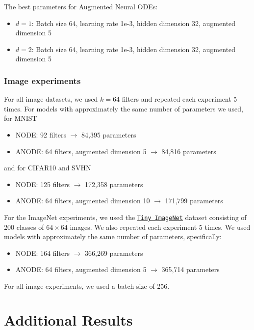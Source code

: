 \documentclass{article}
\begin{document}
The best parameters for Augmented Neural ODEs:

\begin{itemize}
    \item $d=1$: Batch size 64, learning rate 1e-3, hidden dimension 32, augmented dimension 5
    \item $d=2$: Batch size 64, learning rate 1e-3, hidden dimension 32, augmented dimension 5
\end{itemize}

\subsubsection{Image experiments}

For all image datasets, we used $k=64$ filters and repeated each experiment 5 times. For models with approximately the same number of parameters we used, for MNIST

\begin{itemize}
    \item NODE: 92 filters $\to$ 84,395 parameters
    \item ANODE: 64 filters, augmented dimension 5 $\to$ 84,816 parameters
\end{itemize} 

and for CIFAR10 and SVHN

\begin{itemize}
    \item NODE: 125 filters $\to$ 172,358 parameters
    \item ANODE: 64 filters, augmented dimension 10 $\to$ 171,799 parameters
\end{itemize}

For the ImageNet experiments, we used the \href{https://tiny-imagenet.herokuapp.com/}{\texttt{Tiny ImageNet}} dataset consisting of 200 classes of $64\times64$ images. We also repeated each experiment 5 times. We used models with approximately the same number of parameters, specifically:

\begin{itemize}
    \item NODE: 164 filters $\to$ 366,269 parameters
    \item ANODE: 64 filters, augmented dimension 5 $\to$ 365,714 parameters
\end{itemize}

For all image experiments, we used a batch size of 256.

\section{Additional Results}
\end{document}
